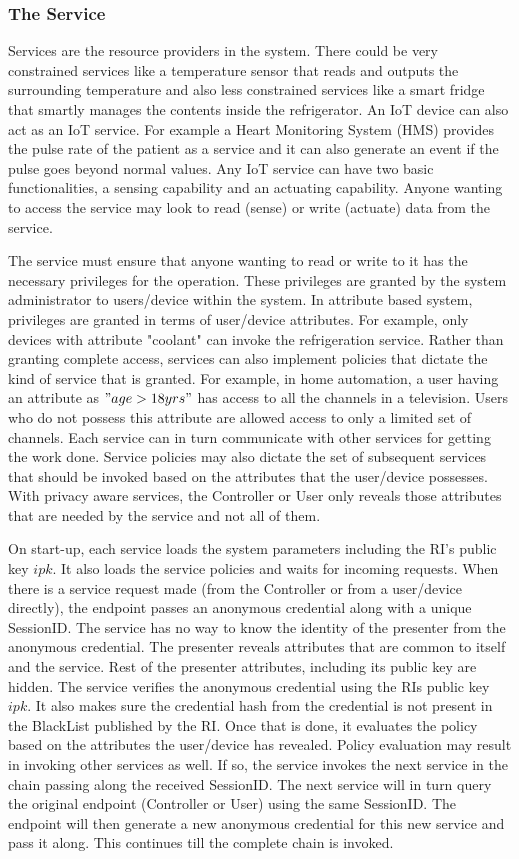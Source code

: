 \documentclass[journal]{IEEEtran}
\begin{document}
\subsubsection{The Service} \label{service}
Services are the resource providers in the system. There could be very constrained services like a temperature sensor that reads and outputs the surrounding temperature and also less constrained services like a smart fridge that smartly manages the contents inside the refrigerator. An IoT device can also act as an IoT service. For example a Heart Monitoring System (HMS) provides the pulse rate of the patient as a service and it can also generate an event if the pulse goes beyond normal values. Any IoT service can have two basic functionalities, a sensing capability and an actuating capability. Anyone wanting to access the service may look to read (sense) or write (actuate) data from the service.

The service must ensure that anyone wanting to read or write to it has the necessary privileges for the operation. These privileges are granted by the system administrator to users/device within the system. In attribute based system, privileges are granted in terms of user/device attributes. For example, only devices with attribute "coolant" can invoke the refrigeration service. Rather than granting complete access, services can also implement policies that dictate the kind of service that is granted. For example, in home automation, a user having an attribute as $"age > 18yrs"$ has access to all the channels in a television. Users who do not possess this attribute are allowed access to only a limited set of channels. Each service can in turn communicate with other services for getting the work done. Service policies may also dictate the set of subsequent services that should be invoked based on the attributes that the user/device possesses. With privacy aware services, the Controller or User only reveals those attributes that are needed by the service and not all of them. 

On start-up, each service loads the system parameters including the RI's public key $ipk$. It also loads the service policies and waits for incoming requests. When there is a service request made (from the Controller or from a user/device directly), the endpoint passes an anonymous credential along with a unique SessionID. The service has no way to know the identity of the presenter from the anonymous credential. The presenter reveals  attributes that are common to itself and the service. Rest of the presenter attributes, including its public key are hidden. The service verifies the anonymous credential using the RIs public key $ipk$. It also makes sure the credential hash from the credential is not present in the BlackList published by the RI. Once that is done, it evaluates the policy based on the attributes the user/device has revealed. Policy evaluation may result in invoking other services as well. If so, the service invokes the next service in the chain passing along the received SessionID. The next service will in turn query the original endpoint (Controller or User) using the same SessionID. The endpoint will then generate a new anonymous credential for this new service and pass it along. This continues till the complete chain is invoked.
\end{document}
